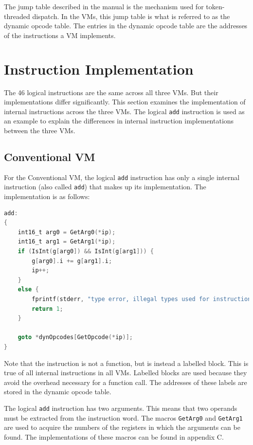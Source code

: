 \documentclass[english,a4paper,12pt]{report}
\begin{document}
The jump table described in the manual is the mechanism used for
token-threaded dispatch. In the VMs, this jump table is what is
referred to as the dynamic opcode table. The entries in the dynamic
opcode table are the addresses of the instructions a VM
implements.

\section{Instruction Implementation}

The 46 logical instructions are the same across all three VMs. But
their implementations differ significantly. This section examines the
implementation of internal instructions across the three VMs. The
logical \verb|add| instruction is used as an example to explain the
differences in internal instruction implementations between the three
VMs.

\subsection{Conventional VM}

For the Conventional VM, the logical \verb|add| instruction has only a
single internal instruction (also called \verb|add|) that makes up its
implementation. The implementation is as follows:

\begin{lstlisting}[language=C]
add:
{
    int16_t arg0 = GetArg0(*ip);
    int16_t arg1 = GetArg1(*ip);
    if (IsInt(g[arg0]) && IsInt(g[arg1])) {
        g[arg0].i += g[arg1].i;
        ip++;
    }
    else {
        fprintf(stderr, "type error, illegal types used for instruction: add");
        return 1;
    }

    goto *dynOpcodes[GetOpcode(*ip)];
}
\end{lstlisting}

Note that the instruction is not a function, but is instead a labelled
block. This is true of all internal instructions in all VMs. Labelled
blocks are used because they avoid the overhead necessary for a
function call. The addresses of these labels are stored in the dynamic
opcode table.

The logical \verb|add| instruction has two arguments. This means that
two operands must be extracted from the instruction word. The macros
\verb|GetArg0| and \verb|GetArg1| are used to acquire the numbers of
the registers in which the arguments can be found. The implementations
of these macros can be found in appendix C.
\end{document}
